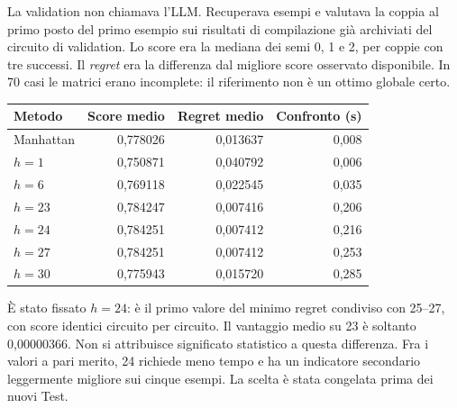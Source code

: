 \documentclass[a4paper,10pt]{article}
\begin{document}
La validation non chiamava l'LLM. Recuperava esempi e valutava la coppia al primo
posto del primo esempio sui risultati di compilazione già archiviati del circuito
di validation. Lo score era la mediana dei semi 0, 1 e 2, per coppie con tre successi.
Il \emph{regret} era la differenza dal migliore score osservato disponibile.
In 70 casi le matrici erano incomplete: il riferimento non è un ottimo globale certo.
\par\medskip\begingroup\small\renewcommand{\arraystretch}{1.18}\setlength{\tabcolsep}{5pt}
\begin{tabularx}{\linewidth}{Xrrr}\toprule
Metodo & Score medio & Regret medio & Confronto (s)\\\midrule
Manhattan & 0,778026 & 0,013637 & 0,008\\
$h=1$ & 0,750871 & 0,040792 & 0,006\\
$h=6$ & 0,769118 & 0,022545 & 0,035\\
$h=23$ & 0,784247 & 0,007416 & 0,206\\
$h=24$ & 0,784251 & 0,007412 & 0,216\\
$h=27$ & 0,784251 & 0,007412 & 0,253\\
$h=30$ & 0,775943 & 0,015720 & 0,285\\
\bottomrule\end{tabularx}\endgroup\par
\begin{center}\end{center}È stato fissato $h=24$: è il primo valore del minimo regret condiviso con
25--27, con score identici circuito per circuito. Il vantaggio medio su 23 è
soltanto 0,00000366. Non si attribuisce significato statistico a questa differenza.
Fra i valori a pari merito, 24 richiede meno tempo e ha un indicatore secondario
leggermente migliore sui cinque esempi. La scelta è stata congelata prima dei nuovi Test.
\end{document}
